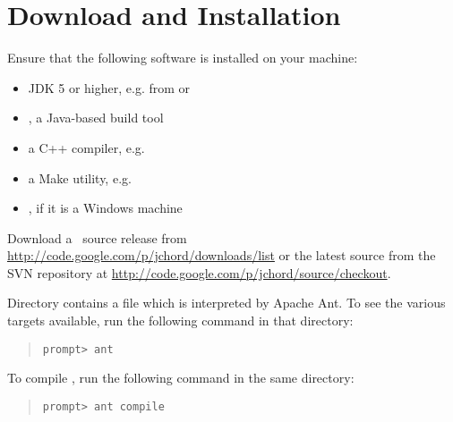 \section{Download and Installation}
\label{sec:download-and-installation}

Ensure that the following software is installed on your machine:

\begin{itemize}
\item
JDK 5 or higher, e.g. from  or
\item
{}, a Java-based build tool
\item
a C++ compiler, e.g. 
\item
a Make utility, e.g. 
\item
{}, if it is a Windows machine
\end{itemize}

Download a \Chord\ source release from \url{http://code.google.com/p/jchord/downloads/list} or
the latest source from the SVN repository at \url{http://code.google.com/p/jchord/source/checkout}.

Directory  contains a  file which is interpreted by Apache Ant.
To see the various targets available, run the following command in that directory:

\begin{quote}
\begin{verbatim}
prompt> ant
\end{verbatim}
\end{quote}

\noindent To compile \Chord, run the following command in the same directory:

\begin{quote}
\begin{verbatim}
prompt> ant compile
\end{verbatim}
\end{quote}

